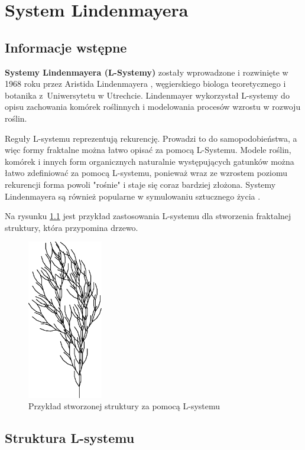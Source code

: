 \documentclass[a4paper,12pt,twoside]{book} %
\begin{document}


\chapter{System Lindenmayera} 


\section{Informacje wstępne}

\textbf{Systemy Lindenmayera (L-Systemy)} zostały wprowadzone i rozwinięte w 1968 roku
 przez Aristida Lindenmayera \cite{modelingOfPlants},
węgierskiego biologa teoretycznego i botanika z~Uniwersytetu w Utrechcie.
Lindenmayer wykorzystał L-systemy do opisu zachowania komórek roślinnych i
modelowania procesów wzrostu w rozwoju roślin.

Reguły L-systemu reprezentują rekurencję.
Prowadzi to do samopodobieństwa, a więc formy fraktalne można łatwo opisać za pomocą L-Systemu.
Modele roślin, komórek i innych form organicznych naturalnie występujących gatunków można łatwo zdefiniować za pomocą L-systemu,
ponieważ wraz ze wzrostem poziomu rekurencji forma powoli "rośnie" i staje się coraz bardziej złożona.
Systemy Lindenmayera są również popularne w symulowaniu sztucznego życia \cite{neuralStructures}.

Na rysunku \ref{fig:lsystreeexample} jest przykład zastosowania L-systemu dla stworzenia 
fraktalnej struktury, która przypomina drzewo.


\begin{figure}[H]
	\centering\includegraphics[height=7cm]{grafika/treefirst}
	\caption{Przykład stworzonej struktury za pomocą L-systemu}
    \label{fig:lsystreeexample}
\end{figure}

\section{Struktura L-systemu}
\end{document}
